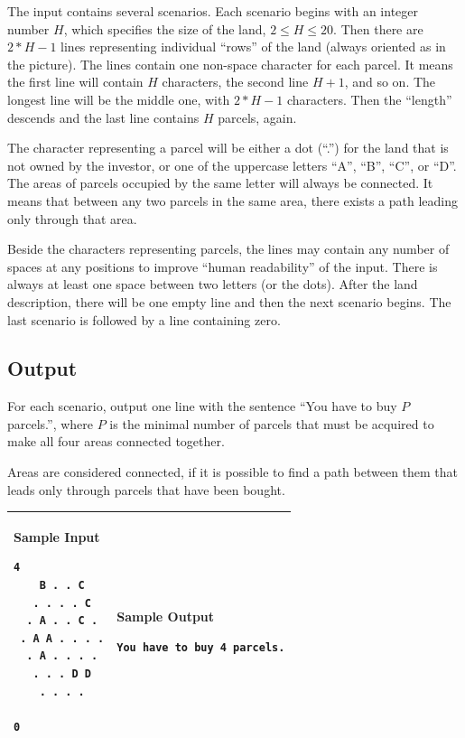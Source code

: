 The input contains several scenarios. Each scenario begins with an integer
number $H$, which specifies the size of the land, $2 \leq H \leq 20$. Then
there are $2*H - 1$ lines representing individual ``rows'' of the land
(always oriented as in the picture). The lines contain one non-space
character for each parcel. It means the first line will contain $H$
characters, the second line $H + 1$, and so on. The longest line will be the
middle one, with $2*H - 1$ characters. Then the ``length'' descends and the
last line contains $H$ parcels, again.

The character representing a parcel will be either a dot (``.'') for the
land that is not owned by the investor, or one of the uppercase letters
``A'', ``B'', ``C'', or ``D''. The areas of parcels occupied by the same
letter will always be connected. It means that between any two parcels in
the same area, there exists a path leading only through that area.

Beside the characters representing parcels, the lines may contain any number
of spaces at any positions to improve ``human readability'' of the input.
There is always at least one space between two letters (or the dots). After
the land description, there will be one empty line and then the next
scenario begins. The last scenario is followed by a line containing zero.

\subsection*{Output}

For each scenario, output one line with the sentence ``You have to buy $P$
parcels.'', where $P$ is the minimal number of parcels that must be acquired
to make all four areas connected together.

Areas are considered connected, if it is possible to find a path between
them that leads only through parcels that have been bought.

\begin{table}[!h]
\centering
\begin{tabular}{|l|l|}
\hline
\begin{minipage}[t]{3in}
\textbf{Sample Input}
\begin{verbatim}
4
    B . . C
   . . . . C
  . A . . C .
 . A A . . . .
  . A . . . .
   . . . D D
    . . . .

0
\end{verbatim}
\vspace{1mm}
\end{minipage}
&

\begin{minipage}[t]{3in}
\textbf{Sample Output}
\begin{verbatim}
You have to buy 4 parcels.
\end{verbatim}
\vspace{1mm}
\end{minipage} \\
\hline
\end{tabular}
\end{table}

\newpage

